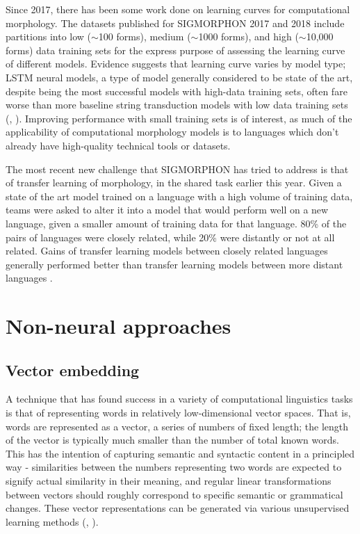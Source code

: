 Since 2017, there has been some work done on learning curves for computational morphology. The datasets published for SIGMORPHON 2017 and 2018 include partitions into low ($\sim$100 forms), medium ($\sim$1000 forms), and high ($\sim$10,000 forms) data training sets for the express purpose of assessing the learning curve of different models. Evidence suggests that learning curve varies by model type; LSTM neural models, a type of model generally considered to be state of the art, despite being the most successful models with high-data training sets, often fare worse than more baseline string transduction models with low data training sets (\cite{Cotterell2017a}, \cite{Cotterell2018b}). Improving performance with small training sets is of interest, as much of the applicability of computational morphology models is to languages which don't already have high-quality technical tools or datasets. 

The most recent new challenge that SIGMORPHON has tried to address is that of transfer learning of morphology, in the shared task earlier this year. Given a state of the art model trained on a language with a high volume of training data, teams were asked to alter it into a model that would perform well on a new language, given a smaller amount of training data for that language. 80\% of the pairs of languages were closely related, while 20\% were distantly or not at all related. Gains of transfer learning models between closely related languages generally performed better than transfer learning models between more distant languages \parencite{McCarthy2019}.

\section{Non-neural approaches}

\subsection{Vector embedding}

A technique that has found success in a variety of computational linguistics tasks is that of representing words in relatively low-dimensional vector spaces. That is, words are represented as a vector, a series of numbers of fixed length; the length of the vector is typically much smaller than the number of total known words. This has the intention of capturing semantic and syntactic content in a principled way - similarities between the numbers representing two words are expected to signify actual similarity in their meaning, and regular linear transformations between vectors should roughly correspond to specific semantic or grammatical changes. These vector representations can be generated via various unsupervised learning methods (\cite{Bilmes2003}, \cite{Alexandrescu2006}).

